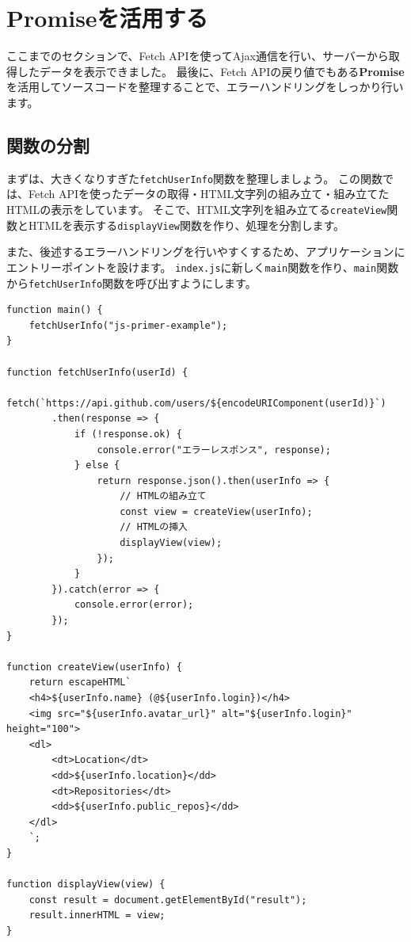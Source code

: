 \hypertarget{use-promise}{%
\section{Promiseを活用する}\label{use-promise}}

ここまでのセクションで、Fetch
APIを使ってAjax通信を行い、サーバーから取得したデータを表示できました。
最後に、Fetch
APIの戻り値でもある\textbf{Promise}を活用してソースコードを整理することで、エラーハンドリングをしっかり行います。

\hypertarget{split-function}{%
\subsection{関数の分割}\label{split-function}}

まずは、大きくなりすぎた\texttt{fetchUserInfo}関数を整理しましょう。
この関数では、Fetch
APIを使ったデータの取得・HTML文字列の組み立て・組み立てたHTMLの表示をしています。
そこで、HTML文字列を組み立てる\texttt{createView}関数とHTMLを表示する\texttt{displayView}関数を作り、処理を分割します。

また、後述するエラーハンドリングを行いやすくするため、アプリケーションにエントリーポイントを設けます。
\texttt{index.js}に新しく\texttt{main}関数を作り、\texttt{main}関数から\texttt{fetchUserInfo}関数を呼び出すようにします。

\begin{lstlisting}
function main() {
    fetchUserInfo("js-primer-example");
}

function fetchUserInfo(userId) {
    fetch(`https://api.github.com/users/${encodeURIComponent(userId)}`)
        .then(response => {
            if (!response.ok) {
                console.error("エラーレスポンス", response);
            } else {
                return response.json().then(userInfo => {
                    // HTMLの組み立て
                    const view = createView(userInfo);
                    // HTMLの挿入
                    displayView(view);
                });
            }
        }).catch(error => {
            console.error(error);
        });
}

function createView(userInfo) {
    return escapeHTML`
    <h4>${userInfo.name} (@${userInfo.login})</h4>
    <img src="${userInfo.avatar_url}" alt="${userInfo.login}" height="100">
    <dl>
        <dt>Location</dt>
        <dd>${userInfo.location}</dd>
        <dt>Repositories</dt>
        <dd>${userInfo.public_repos}</dd>
    </dl>
    `;
}

function displayView(view) {
    const result = document.getElementById("result");
    result.innerHTML = view;
}
\end{lstlisting}


